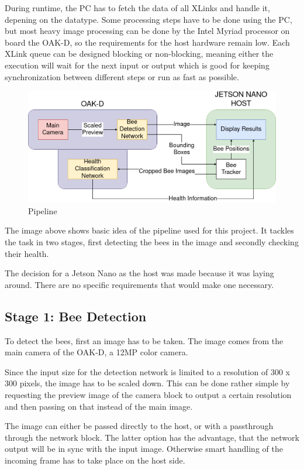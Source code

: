 \documentclass[a4paper,titlepage]{article}
\begin{document}
During runtime, the PC has to fetch the data of all XLinks and handle it, depening on the datatype.
Some processing steps have to be done using the PC, but most heavy image processing can be done by the Intel Myriad processor on board the OAK-D, so the requirements for the host hardware remain low.
Each XLink queue can be designed blocking or non-blocking, meaning either the execution will wait for the next input or output which is good for keeping synchronization between different steps or run as fast as possible.

\begin{figure}[H]
    \includegraphics[width=\textwidth]{TGMB_Pipeline.png}
    \caption{Pipeline}
\end{figure}

The image above shows basic idea of the pipeline used for this project.
It tackles the task in two stages, first detecting the bees in the image and secondly checking their health.

The decision for a Jetson Nano as the host was made because it was laying around.
There are no specific requirements that would make one necessary.

\newpage
\subsection{Stage 1: Bee Detection}

To detect the bees, first an image has to be taken.
The image comes from the main camera of the OAK-D, a 12MP color camera.

Since the input size for the detection network is limited to a resolution of 300 x 300 pixels, the image has to be scaled down.
This can be done rather simple by requesting the preview image of the camera block to output a certain resolution and then passing on that instead of the main image.

The image can either be passed directly to the host, or with a passthrough through the network block.
The latter option has the advantage, that the network output will be in sync with the input image.
Otherwise smart handling of the incoming frame has to take place on the host side.
\end{document}
